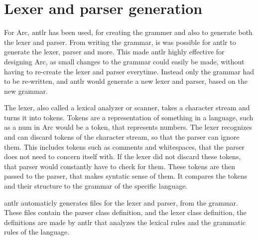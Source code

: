 \section{Lexer and parser generation}


For Arc, \gls{antlr} has been used, for creating the grammer and also to generate both the lexer and parser. From writing the grammar, is was possible for \gls{antlr} to generate the lexer, parser and more.\cite{Parr2014} This made \gls{antlr} highly effective for designing Arc, as small changes to the grammar could easily be made, without having to re-create the lexer and parser everytime. Instead only the grammar had to be re-written, and \gls{antlr} would generate a new lexer and parser, based on the new grammar.

The lexer, also called a lexical analyzer or scanner, takes a character stream and turns it into tokens. Tokens are a representation of something in a language, such as a num in Arc would be a token, that represents numbers. The lexer recognizes and can discard tokens of the character stream, so that the parser can ignore them. This includes tokens such as comments and whitespaces, that the parser does not need to concern itself with. If the lexer did not discard these tokens, that parser would constantly have to check for them. These tokens are then passed to the parser, that makes syntatic sense of them. It compares the tokens and their structure to the grammar of the specific language.\cite{Parr2014}



\gls{antlr} automaticly generates files for the lexer and parser, from the grammar. These files contain the parser class definition, and the lexer class definition, the definitions are made by \gls{antlr} that analyzes the lexical rules and the grammatic rules of the language.\cite{Parr2014}

